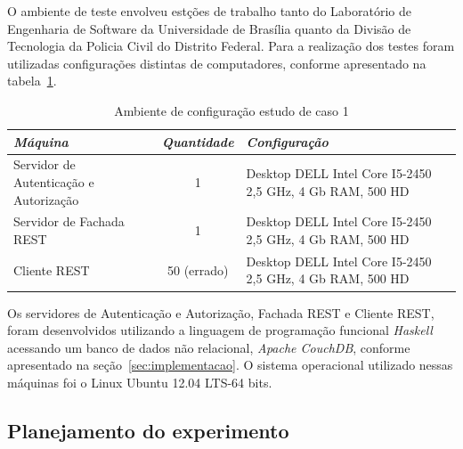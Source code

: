O ambiente de teste envolveu est\c c\~{o}es de trabalho tanto do Laboratório de Engenharia de Software da Universidade de Brasília quanto da Divisão de Tecnologia da Policia Civil do Distrito Federal. Para a realização dos testes foram utilizadas configurações distintas de computadores, conforme apresentado na tabela~\ref{tb:estudo_caso1}.
%
\begin{table}[h]
    \begin{tabular}{|l|c|p{6cm}|}
    \hline
    \textbf{\emph{Máquina }}                   & \textbf{\emph{Quantidade}} & \textbf{\emph{Configuração}}                                                                               \\ \hline
    Servidor de Autenticação e Autorização  & 1          & Desktop DELL Intel Core I5-2450 2,5 GHz, 4 Gb RAM, 500 HD \\ \hline
    Servidor de Fachada REST  & 1          & Desktop DELL Intel Core I5-2450 2,5 GHz, 4 Gb RAM, 500 HD\\ \hline
    Cliente REST                   & {\color{red}50 (errado)}       & Desktop DELL Intel Core I5-2450 2,5 GHz, 4 Gb RAM, 500 HD                                    \\ \hline
    \end{tabular}
    \caption {Ambiente de configuração estudo de caso 1}\label{tb:estudo_caso1}
\end{table}

Os servidores de Autenticação e Autorização, Fachada REST e Cliente REST, foram desenvolvidos utilizando a linguagem de programação funcional \emph{Haskell} acessando um banco de dados não relacional, \emph{Apache CouchDB}, conforme apresentado na seção~\ref{sec:implementacao}. O sistema operacional utilizado nessas máquinas foi o Linux Ubuntu 12.04 LTS-64 bits.



\subsection{Planejamento do experimento}

